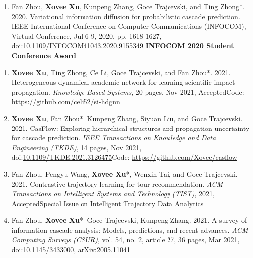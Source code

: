 \begin{enumerate}[resume]
    \item Fan Zhou, \textbf{Xovee Xu}, Kunpeng Zhang, Goce Trajcevski, and Ting Zhong*. 2020. Variational information diffusion for probabilistic cascade prediction. IEEE International Conference on Computer Communications (INFOCOM), Virtual Conference, Jul 6-9, 2020, pp. 1618-1627, doi:\href{https://doi.org/10.1109/INFOCOM41043.2020.9155349}{10.1109/INFOCOM41043.2020.9155349}
    \newline \textbf{\color{red}INFOCOM 2020 Student Conference Award}
\end{enumerate}


\begin{enumerate}[resume]
    \item \textbf{Xovee Xu}, Ting Zhong, Ce Li, Goce Trajcevski, and Fan Zhou*. 2021. Heterogeneous dynamical academic network for learning scientific impact propagation. \textit{Knowledge-Based Systems}, 20 pages, Nov 2021, Accepted\newline Code: \url{https://github.com/celi52/si-hdgnn}
    \item \textbf{Xovee Xu}, Fan Zhou*, Kunpeng Zhang, Siyuan Liu, and Goce Trajcevski. 2021. CasFlow: Exploring hierarchical structures and propagation uncertainty for cascade prediction. \textit{IEEE Transactions on Knowledge and Data Engineering (TKDE)}, 14 pages, Nov 2021, doi:\href{https://doi.org/10.1109/TKDE.2021.3126475}{10.1109/TKDE.2021.3126475}\newline Code: \url{https://github.com/Xovee/casflow}
    \item Fan Zhou, Pengyu Wang, \textbf{Xovee Xu}*, Wenxin Tai, and Goce Trajcevski. 2021. Contrastive trajectory learning for tour recommendation. \textit{ACM Transactions on Intelligent Systems and Technology (TIST)}, 2021, Accepted\newline Special Issue on Intelligent Trajectory Data Analytics
    \item Fan Zhou, \textbf{Xovee Xu}*, Goce Trajcevski, Kunpeng Zhang. 2021. A survey of information cascade analysis: Models, predictions, and recent advances. \textit{ACM Computing Surveys (CSUR)}, vol. 54, no. 2, article 27, 36 pages, Mar 2021, doi:\href{https://xovee.cn/html/paper-redirects/csur2021.html}{10.1145/3433000}, \href{https://arxiv.org/abs/2005.11041}{arXiv:2005.11041}
\end{enumerate}



